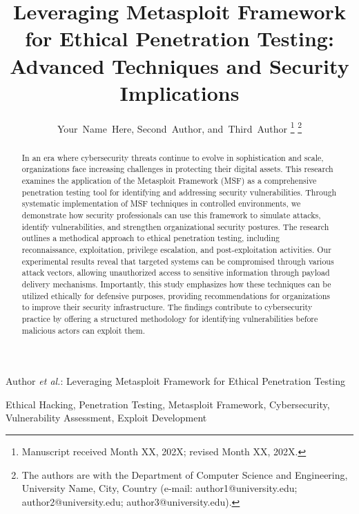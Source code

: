 \documentclass[journal,twoside]{IEEEtran}
\begin{document}
\title{Leveraging Metasploit Framework for Ethical Penetration Testing: Advanced Techniques and Security Implications}

\author{Your~Name~Here,
        Second~Author,
        and~Third~Author
\thanks{Manuscript received Month XX, 202X; revised Month XX, 202X.}
\thanks{The authors are with the Department of Computer Science and Engineering, University Name, City, Country (e-mail: author1@university.edu; author2@university.edu; author3@university.edu).}
}

{Author \MakeLowercase{\textit{et al.}}: Leveraging Metasploit Framework for Ethical Penetration Testing}

\maketitle

\begin{abstract}
In an era where cybersecurity threats continue to evolve in sophistication and scale, organizations face increasing challenges in protecting their digital assets. This research examines the application of the Metasploit Framework (MSF) as a comprehensive penetration testing tool for identifying and addressing security vulnerabilities. Through systematic implementation of MSF techniques in controlled environments, we demonstrate how security professionals can use this framework to simulate attacks, identify vulnerabilities, and strengthen organizational security postures. The research outlines a methodical approach to ethical penetration testing, including reconnaissance, exploitation, privilege escalation, and post-exploitation activities. Our experimental results reveal that targeted systems can be compromised through various attack vectors, allowing unauthorized access to sensitive information through payload delivery mechanisms. Importantly, this study emphasizes how these techniques can be utilized ethically for defensive purposes, providing recommendations for organizations to improve their security infrastructure. The findings contribute to cybersecurity practice by offering a structured methodology for identifying vulnerabilities before malicious actors can exploit them.
\end{abstract}

\begin{IEEEkeywords}
Ethical Hacking, Penetration Testing, Metasploit Framework, Cybersecurity, Vulnerability Assessment, Exploit Development
\end{IEEEkeywords}
\end{document}
